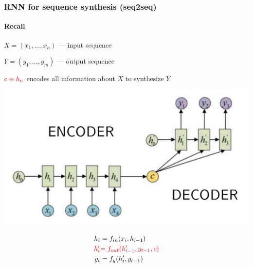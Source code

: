 \documentclass[fullscreen=true, bookmarks=true, hyperref={pdfencoding=unicode}]{beamer}
\begin{document}

\begin{frame}
  \frametitle{RNN for sequence synthesis (seq2seq)}
  \framesubtitle{Recall}

  $X = (x_1, \dots, x_n)$ — input sequence

  $Y = (y_1, \dots, y_m)$ — output sequence

  ${\color{red}c \equiv h_n}$ encodes all information about $X$ to synthesize $Y$

  \begin{center}
    \includegraphics[keepaspectratio,
                     width=.5\paperwidth]{seq2seq.png}
   \end{center}

  \begin{center}
    \begin{align*}
      h_i &= f_{in}(x_i, h_{i-1}) \\
      {\color{red}h_t^\prime} &{\color{red}= f_{out}(h_{t-1}^\prime,y_{t-1},c)} \\
      y_t &= f_{y}(h_t^\prime, y_{t-1})
    \end{align*}
  \end{center}
\end{frame}

\end{document}
